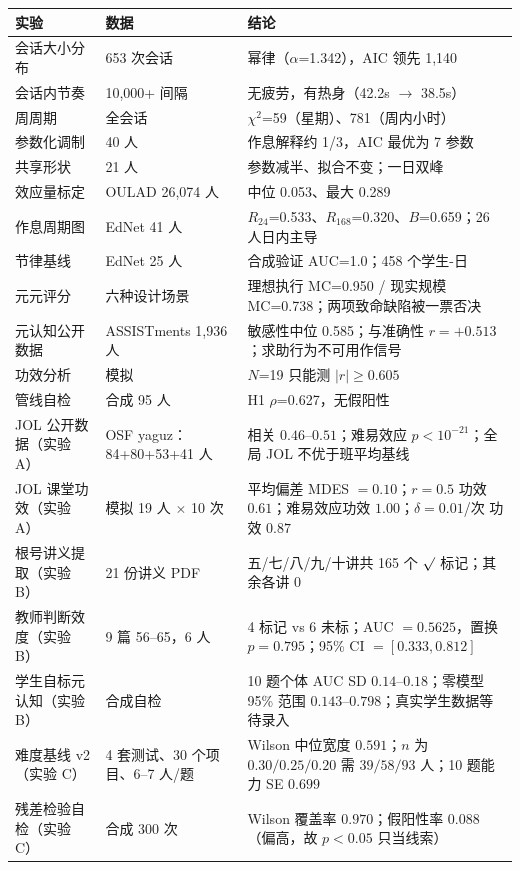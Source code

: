 \documentclass[UTF8,a4paper,11pt]{ctexart}
\begin{document}
\begin{longtable}{@{}p{4.4cm}p{3.2cm}p{7.2cm}@{}}
\toprule
\textbf{实验} & \textbf{数据} & \textbf{结论} \\
\midrule
会话大小分布 & 653 次会话 & 幂律（$\alpha$=1.342），AIC 领先 1,140 \\
会话内节奏 & 10,000+ 间隔 & 无疲劳，有热身（42.2s $\to$ 38.5s） \\
周周期 & 全会话 & $\chi^2$=59（星期）、781（周内小时） \\
参数化调制 & 40 人 & 作息解释约 1/3，AIC 最优为 7 参数 \\
共享形状 & 21 人 & 参数减半、拟合不变；一日双峰 \\
效应量标定 & OULAD 26,074 人 & 中位 0.053、最大 0.289 \\
作息周期图 & EdNet 41 人 & $R_{24}$=0.533、$R_{168}$=0.320、$B$=0.659；26 人日内主导 \\
节律基线 & EdNet 25 人 & 合成验证 AUC=1.0；458 个学生-日 \\
元元评分 & 六种设计场景 & 理想执行 MC=0.950 / 现实规模 MC=0.738；两项致命缺陷被一票否决 \\
元认知公开数据 & ASSISTments 1,936 人 & 敏感性中位 0.585；与准确性 $r=+0.513$；求助行为不可用作信号 \\
功效分析 & 模拟 & $N$=19 只能测 $\lvert r\rvert \ge 0.605$ \\
管线自检 & 合成 95 人 & H1 $\rho$=0.627，无假阳性 \\
JOL 公开数据（实验 A） & OSF yaguz：84+80+53+41 人 & 相关 $0.46$--$0.51$；难易效应 $p<10^{-21}$；全局 JOL 不优于班平均基线 \\
JOL 课堂功效（实验 A） & 模拟 19 人 $\times$ 10 次 & 平均偏差 MDES $=0.10$；$r=0.5$ 功效 $0.61$；难易效应功效 $1.00$；$\delta=0.01$/次 功效 $0.87$ \\
根号讲义提取（实验 B） & 21 份讲义 PDF & 五/七/八/九/十讲共 165 个 $\surd$ 标记；其余各讲 0 \\
教师判断效度（实验 B） & 9 篇 56--65，6 人 & 4 标记 vs 6 未标；AUC $=0.5625$，置换 $p=0.795$；95\% CI $=[0.333,0.812]$ \\
学生自标元认知（实验 B） & 合成自检 & 10 题个体 AUC SD $0.14$--$0.18$；零模型 95\% 范围 $0.143$--$0.798$；真实学生数据等待录入 \\
难度基线 v2（实验 C） & 4 套测试、30 个项目、6--7 人/题 & Wilson 中位宽度 $0.591$；$n$ 为 $0.30/0.25/0.20$ 需 $39/58/93$ 人；10 题能力 SE $0.699$ \\
残差检验自检（实验 C） & 合成 300 次 & Wilson 覆盖率 $0.970$；假阳性率 $0.088$（偏高，故 $p<0.05$ 只当线索） \\
\bottomrule
\end{longtable}
\end{document}

